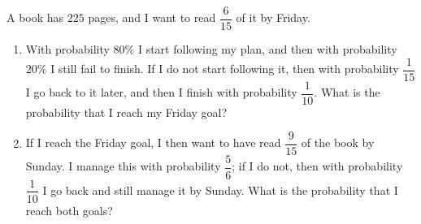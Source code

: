 A book has $225$ pages, and I want to read $\dfrac6{15}$ of it by Friday.
\begin{enumerate}
\item[(a)] With probability $80\%$ I start following my plan, and then with probability $20\%$ I still fail to finish. If I do not start following it, then with probability $\dfrac1{15}$ I go back to it later, and then I finish with probability $\dfrac1{10}$. What is the probability that I reach my Friday goal?
\item[(b)] If I reach the Friday goal, I then want to have read $\dfrac9{15}$ of the book by Sunday. I manage this with probability $\dfrac56$; if I do not, then with probability $\dfrac1{10}$ I go back and still manage it by Sunday. What is the probability that I reach both goals?
\end{enumerate}
